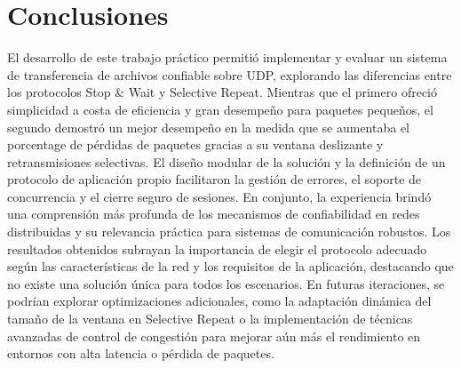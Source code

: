 \section{Conclusiones}

El desarrollo de este trabajo práctico permitió implementar y evaluar un sistema de transferencia de archivos confiable sobre UDP, explorando las diferencias entre los protocolos Stop \& Wait y Selective Repeat. Mientras que el primero ofreció simplicidad a costa de eficiencia y gran desempeño para paquetes pequeños, el segundo demostró un mejor desempeño en la medida que se aumentaba el porcentage de pérdidas de paquetes gracias a su ventana deslizante y retransmisiones selectivas. El diseño modular de la solución y la definición de un protocolo de aplicación propio facilitaron la gestión de errores, el soporte de concurrencia y el cierre seguro de sesiones. En conjunto, la experiencia brindó una comprensión más profunda de los mecanismos de confiabilidad en redes distribuidas y su relevancia práctica para sistemas de comunicación robustos. Los resultados obtenidos subrayan la importancia de elegir el protocolo adecuado según las características de la red y los requisitos de la aplicación, destacando que no existe una solución única para todos los escenarios. En futuras iteraciones, se podrían explorar optimizaciones adicionales, como la adaptación dinámica del tamaño de la ventana en Selective Repeat o la implementación de técnicas avanzadas de control de congestión para mejorar aún más el rendimiento en entornos con alta latencia o pérdida de paquetes.